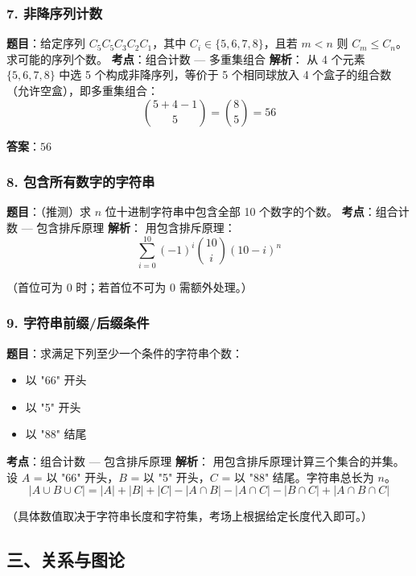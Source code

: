 \documentclass[10pt,a4paper,openany]{ctexbook}
\theoremstyle{definition}
\theoremstyle{remark}
\begin{document}
\subsubsection{7. 非降序列计数}

\textbf{题目}：给定序列 $C_5 C_5 C_3 C_2 C_1$，其中 $C_i \in \{5,6,7,8\}$，且若 $m < n$ 则 $C_m \le C_n$。求可能的序列个数。
\textbf{考点}：组合计数 — 多重集组合
\textbf{解析}：
从 4 个元素 $\{5,6,7,8\}$ 中选 5 个构成非降序列，等价于 5 个相同球放入 4 个盒子的组合数（允许空盒），即多重集组合：
\[
 \binom{5+4-1}{5} = \binom{8}{5} = 56 
\]

\textbf{答案}：$\boxed{56}$
\vspace{-2pt}

\subsubsection{8. 包含所有数字的字符串}

\textbf{题目}：（推测）求 $n$ 位十进制字符串中包含全部 10 个数字的个数。
\textbf{考点}：组合计数 — 包含排斥原理
\textbf{解析}：
用包含排斥原理：
\[
 \sum_{i=0}^{10} (-1)^i \binom{10}{i} (10-i)^n 
\]

（首位可为 $0$ 时；若首位不可为 $0$ 需额外处理。）
\vspace{-2pt}

\subsubsection{9. 字符串前缀/后缀条件}

\textbf{题目}：求满足下列至少一个条件的字符串个数：
\begin{itemize}
\item 以 "66" 开头
\item 以 "5" 开头
\item 以 "88" 结尾

\end{itemize}

\textbf{考点}：组合计数 — 包含排斥原理
\textbf{解析}：
用包含排斥原理计算三个集合的并集。设 $A$ = 以 "66" 开头，$B$ = 以 "5" 开头，$C$ = 以 "88" 结尾。字符串总长为 $n$。
\[
|A \cup B \cup C| = |A| + |B| + |C| - |A \cap B| - |A \cap C| - |B \cap C| + |A \cap B \cap C|
\]

（具体数值取决于字符串长度和字符集，考场上根据给定长度代入即可。）
\vspace{-2pt}

\subsection{三、关系与图论}
\end{document}
